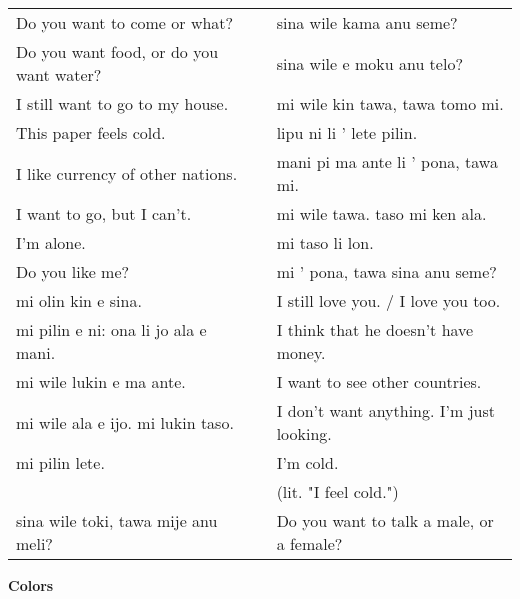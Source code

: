 \begin{supertabular}{p{5,5cm}|ll}
Do you want to come or what?  && sina wile kama anu seme? \\ %
Do you want food, or do you want water?  && sina wile e moku anu telo? \\ %
I still want to go to my house.  && mi wile kin tawa, tawa tomo mi. \\ %
This paper feels cold.  && lipu ni li ' lete pilin. \\ %
I like currency of other nations.  && mani pi ma ante li ' pona, tawa mi. \\ %
I want to go, but I can't.  && mi wile tawa. taso mi ken ala. \\ %
I'm alone.  && mi taso li lon. \\ %
Do you like me?  && mi ' pona, tawa sina anu seme? \\ %
mi olin kin e sina.  && I still love you. / I love you too.\\
mi pilin e ni: ona li jo ala e mani.  && I think that he doesn't have money. \\
mi wile lukin e ma ante.  && I want to see other countries. \\
mi wile ala e ijo. mi lukin taso.  && I don't want anything. I'm just looking. \\
mi pilin lete.  && I'm cold. \\
 &&   (lit. "I feel cold.") \\ %
sina wile toki, tawa mije anu meli?  && Do you want to talk a male, or a female? \\
\end{supertabular} 
\newpage
\textbf{Colors} 
\label{'colors'}

